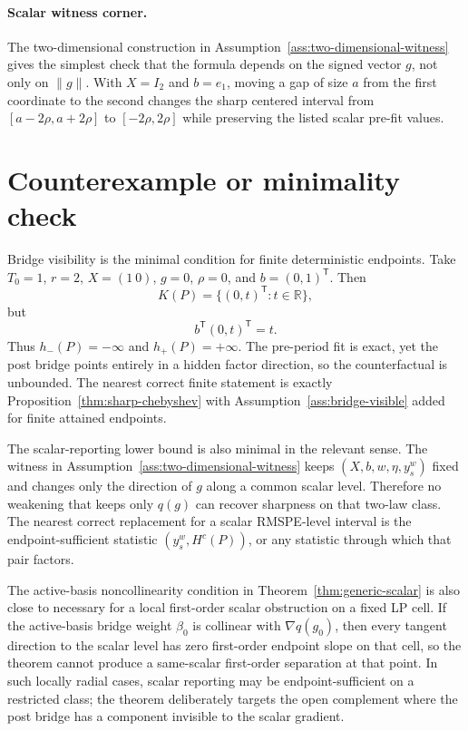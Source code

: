 \documentclass[11pt]{article}
\newcommand{\transpose}{\mathsf{T}}
\newcommand{\R}{\mathbb{R}}
\theoremstyle{definition}
\theoremstyle{plain}
\theoremstyle{remark}
\begin{document}
\paragraph{Scalar witness corner.}
The two-dimensional construction in
Assumption~\ref{ass:two-dimensional-witness} gives the simplest check that the
formula depends on the signed vector \(g\), not only on \(\|g\|\).  With
\(X=I_2\) and \(b=e_1\), moving a gap of size \(a\) from the first coordinate to
the second changes the sharp centered interval from
\([a-2\rho,a+2\rho]\) to \([-2\rho,2\rho]\) while preserving the listed scalar
pre-fit values.

\section{Counterexample or minimality check}
Bridge visibility is the minimal condition for finite deterministic endpoints.
Take \(T_0=1\), \(r=2\), \(X=(1\ 0)\), \(g=0\), \(\rho=0\), and
\(b=(0,1)^\transpose\).  Then
\[
K(P)=\{(0,t)^\transpose:t\in\R\},
\]
but
\[
b^\transpose(0,t)^\transpose=t.
\]
Thus \(h_-(P)=-\infty\) and \(h_+(P)=+\infty\).  The pre-period fit is exact,
yet the post bridge points entirely in a hidden factor direction, so the
counterfactual is unbounded.  The nearest correct finite statement is exactly
Proposition~\ref{thm:sharp-chebyshev} with Assumption~\ref{ass:bridge-visible}
added for finite attained endpoints.

The scalar-reporting lower bound is also minimal in the relevant sense.  The
witness in Assumption~\ref{ass:two-dimensional-witness} keeps
\((X,b,w,\eta,y_s^w)\) fixed and changes only the direction of \(g\) along a
common scalar level.  Therefore no weakening that keeps only \(q(g)\) can
recover sharpness on that two-law class.  The nearest correct replacement for a
scalar RMSPE-level interval is the endpoint-sufficient statistic
\((y_s^w,H^c(P))\), or any statistic through which that pair factors.

The active-basis noncollinearity condition in
Theorem~\ref{thm:generic-scalar} is also close to necessary for a local
first-order scalar obstruction on a fixed LP cell.  If the active-basis bridge
weight \(\beta_0\) is collinear with \(\nabla q(g_0)\), then every tangent
direction to the scalar level has zero first-order endpoint slope on that cell,
so the theorem cannot produce a same-scalar first-order separation at that
point.  In such locally radial cases, scalar reporting may be
endpoint-sufficient on a restricted class; the theorem deliberately targets the
open complement where the post bridge has a component invisible to the scalar
gradient.
\end{document}
